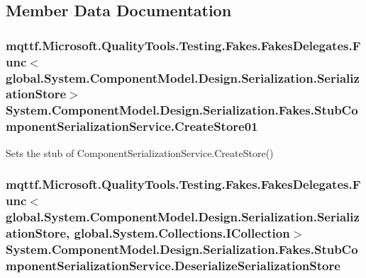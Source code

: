 \subsection{Member Data Documentation}
\hypertarget{class_system_1_1_component_model_1_1_design_1_1_serialization_1_1_fakes_1_1_stub_component_serialization_service_ab4cf3ec039b89409ab3db04cf9346a57}{
\subsubsection[{Create\-Store01}]{\setlength{\rightskip}{0pt plus 5cm}mqttf.\-Microsoft.\-Quality\-Tools.\-Testing.\-Fakes.\-Fakes\-Delegates.\-Func$<$global.\-System.\-Component\-Model.\-Design.\-Serialization.\-Serialization\-Store$>$ System.\-Component\-Model.\-Design.\-Serialization.\-Fakes.\-Stub\-Component\-Serialization\-Service.\-Create\-Store01}}\label{class_system_1_1_component_model_1_1_design_1_1_serialization_1_1_fakes_1_1_stub_component_serialization_service_ab4cf3ec039b89409ab3db04cf9346a57}


Sets the stub of Component\-Serialization\-Service.\-Create\-Store()

\hypertarget{class_system_1_1_component_model_1_1_design_1_1_serialization_1_1_fakes_1_1_stub_component_serialization_service_a1c39d4e88fef06f734a53c24ebf0a713}{
\subsubsection[{Deserialize\-Serialization\-Store}]{\setlength{\rightskip}{0pt plus 5cm}mqttf.\-Microsoft.\-Quality\-Tools.\-Testing.\-Fakes.\-Fakes\-Delegates.\-Func$<$global.\-System.\-Component\-Model.\-Design.\-Serialization.\-Serialization\-Store, global.\-System.\-Collections.\-I\-Collection$>$ System.\-Component\-Model.\-Design.\-Serialization.\-Fakes.\-Stub\-Component\-Serialization\-Service.\-Deserialize\-Serialization\-Store}}\label{class_system_1_1_component_model_1_1_design_1_1_serialization_1_1_fakes_1_1_stub_component_serialization_service_a1c39d4e88fef06f734a53c24ebf0a713}


